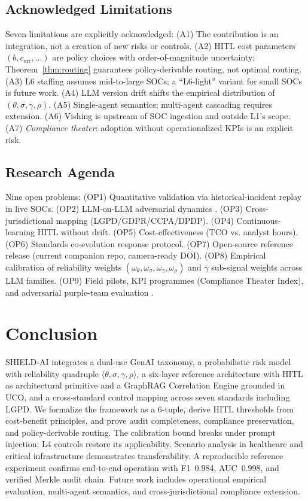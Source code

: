 \documentclass[journal]{IEEEtran}
\begin{document}
\subsection{Acknowledged Limitations}
Seven limitations are explicitly acknowledged:
(A1) The contribution is an integration, not a creation of new risks or controls.
(A2) HITL cost parameters $(b, c_{\text{err}}, \ldots)$ are policy choices with order-of-magnitude
uncertainty; Theorem~\ref{thm:routing} guarantees policy-derivable routing, not optimal routing.
(A3) L6 staffing assumes mid-to-large SOCs; a ``L6-light'' variant for small SOCs is future work.
(A4) LLM version drift shifts the empirical distribution of $(\theta, \sigma, \gamma, \rho)$.
(A5) Single-agent semantics; multi-agent cascading \cite{owasp2025agentic} requires extension.
(A6) Vishing is upstream of SOC ingestion and outside L1's scope.
(A7) \emph{Compliance theater}: adoption without operationalized KPIs is an explicit risk.

\subsection{Research Agenda}
Nine open problems:
(OP1) Quantitative validation via historical-incident replay in live SOCs.
(OP2) LLM-on-LLM adversarial dynamics \cite{owasp2025agentic,lga2026}.
(OP3) Cross-jurisdictional mapping (LGPD/GDPR/CCPA/DPDP).
(OP4) Continuous-learning HITL without drift.
(OP5) Cost-effectiveness (TCO vs. analyst hours).
(OP6) Standards co-evolution response protocol.
(OP7) Open-source reference release (current companion repo, camera-ready DOI).
(OP8) Empirical calibration of reliability weights $(\omega_\theta, \omega_\sigma, \omega_\gamma,
\omega_\rho)$ and $\gamma$ sub-signal weights across LLM families.
(OP9) Field pilots, KPI programmes (Compliance Theater Index), and adversarial purple-team
evaluation \cite{liu2024formalizing,zou2023universal}.

\section{Conclusion}
\label{sec:conclusion}

SHIELD-AI integrates a dual-use GenAI taxonomy, a probabilistic risk model with reliability
quadruple $\langle\theta,\sigma,\gamma,\rho\rangle$, a six-layer reference architecture with
HITL as architectural primitive and a GraphRAG Correlation Engine grounded in UCO, and a
cross-standard control mapping across seven standards including LGPD. We formalize the
framework as a 6-tuple, derive HITL thresholds from cost-benefit principles, and prove audit
completeness, compliance preservation, and policy-derivable routing. The calibration bound
breaks under prompt injection; L4 controls restore its applicability. Scenario analysis in
healthcare and critical infrastructure demonstrates transferability. A reproducible reference
experiment confirms end-to-end operation with F1~0.984, AUC~0.998, and verified Merkle audit
chain. Future work includes operational empirical evaluation, multi-agent semantics, and
cross-jurisdictional compliance extension.
\end{document}
